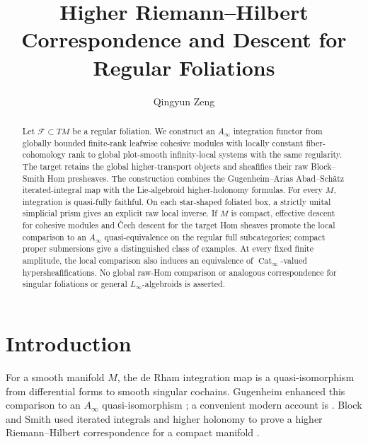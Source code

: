\documentclass[12pt]{amsart}
\theoremstyle{definition}
\theoremstyle{remark}
\numberwithin{equation}{section}
\newcommand{\CF}{{\mathcal F}}
\newcommand{\1}{{\mathbb{1}}}
\begin{document}
\raggedbottom

\title{Higher Riemann--Hilbert Correspondence and Descent
for Regular Foliations}

\author{Qingyun Zeng}
\address{Department of Mathematics,
	University of Pennsylvania, Philadelphia, PA 19104}

\date{}

\begin{abstract}
Let $\CF\subset TM$ be a regular foliation.  We construct an
$A_\infty$ integration functor from globally bounded finite-rank
leafwise cohesive modules with locally constant fiber-cohomology rank
to global plot-smooth infinity-local systems with the same regularity.
The target retains the global higher-transport objects and sheafifies
their raw Block--Smith Hom presheaves.  The construction combines the
Gugenheim--Arias Abad--Sch\"atz iterated-integral map with the
Lie-algebroid higher-holonomy formulas.  For every $M$, integration is
quasi-fully faithful.  On each star-shaped foliated box, a strictly
unital simplicial prism gives an explicit raw local inverse.  If $M$
is compact, effective descent for cohesive modules and \v{C}ech
descent for the target Hom sheaves promote the local comparison to an
$A_\infty$ quasi-equivalence on the regular full subcategories;
compact proper submersions give a distinguished class of examples.
At every fixed finite amplitude, the local comparison also induces an
equivalence of $\operatorname{Cat}_\infty$-valued
hypersheafifications.  No global raw-Hom comparison or analogous
correspondence for singular foliations or general
$L_\infty$-algebroids is asserted.
\end{abstract}

\maketitle
\enlargethispage{2pt}
\tableofcontents

\section{Introduction}

For a smooth manifold $M$, the de Rham integration map is a
quasi-isomorphism from differential forms to smooth singular cochains.
Gugenheim enhanced this comparison to an $A_{\infty}$ quasi-isomorphism
\cite{Gug77}; a convenient modern account is
\cite[Theorem 3.25]{AS12}.  Block and Smith used iterated integrals and
higher holonomy to prove a higher Riemann--Hilbert correspondence for a
compact manifold \cite[Theorem 4.1]{BS14}.
\end{document}
